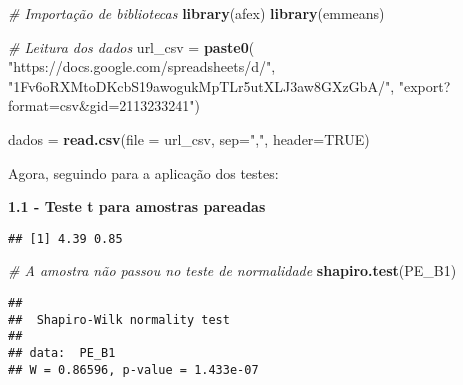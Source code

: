 \documentclass[
]{article}
\newenvironment{Shaded}{\begin{snugshade}}{\end{snugshade}}
\newcommand{\AttributeTok}[1]{\textcolor[rgb]{0.13,0.29,0.53}{#1}}
\newcommand{\CommentTok}[1]{\textcolor[rgb]{0.56,0.35,0.01}{\textit{#1}}}
\newcommand{\ConstantTok}[1]{\textcolor[rgb]{0.56,0.35,0.01}{#1}}
\newcommand{\DecValTok}[1]{\textcolor[rgb]{0.00,0.00,0.81}{#1}}
\newcommand{\FunctionTok}[1]{\textcolor[rgb]{0.13,0.29,0.53}{\textbf{#1}}}
\newcommand{\NormalTok}[1]{#1}
\newcommand{\OtherTok}[1]{\textcolor[rgb]{0.56,0.35,0.01}{#1}}
\newcommand{\SpecialCharTok}[1]{\textcolor[rgb]{0.81,0.36,0.00}{\textbf{#1}}}
\newcommand{\StringTok}[1]{\textcolor[rgb]{0.31,0.60,0.02}{#1}}
\begin{document}
\begin{Shaded}
\begin{Highlighting}[]
\CommentTok{\# Importação de bibliotecas}
\FunctionTok{library}\NormalTok{(afex)}
\FunctionTok{library}\NormalTok{(emmeans)}

\CommentTok{\# Leitura dos dados}
\NormalTok{url\_csv }\OtherTok{=} \FunctionTok{paste0}\NormalTok{(}
  \StringTok{"https://docs.google.com/spreadsheets/d/"}\NormalTok{,}
  \StringTok{"1Fv6oRXMtoDKcbS19awogukMpTLr5utXLJ3aw8GXzGbA/"}\NormalTok{,}
  \StringTok{"export?format=csv\&gid=2113233241"}\NormalTok{)}

\NormalTok{dados }\OtherTok{=} \FunctionTok{read.csv}\NormalTok{(}\AttributeTok{file =}\NormalTok{ url\_csv, }\AttributeTok{sep=}\StringTok{","}\NormalTok{, }\AttributeTok{header=}\ConstantTok{TRUE}\NormalTok{)}
\end{Highlighting}
\end{Shaded}

Agora, seguindo para a aplicação dos testes:

\textbf{1.1 - Teste t para amostras pareadas}

\begin{Shaded}
\end{Shaded}

\begin{verbatim}
## [1] 4.39 0.85
\end{verbatim}

\begin{Shaded}
\begin{Highlighting}[]
\CommentTok{\# A amostra não passou no teste de normalidade}
\FunctionTok{shapiro.test}\NormalTok{(PE\_B1)}
\end{Highlighting}
\end{Shaded}

\begin{verbatim}
## 
##  Shapiro-Wilk normality test
## 
## data:  PE_B1
## W = 0.86596, p-value = 1.433e-07
\end{verbatim}
\end{document}
